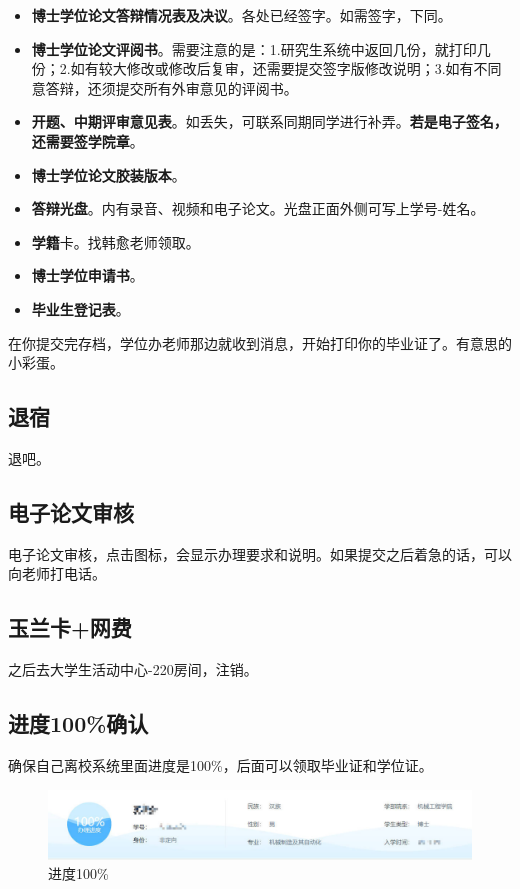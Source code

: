\documentclass[12pt,a4paper]{ctexart}
\begin{document}
\begin{itemize}[label=〇]
\item \textbf{博士学位论文答辩情况表及决议}。各处已经签字。如需签字，下同。
\item \textbf{博士学位论文评阅书}。需要注意的是：1.研究生系统中返回几份，就打印几份；2.如有较大修改或修改后复审，还需要提交签字版修改说明；3.如有不同意答辩，还须提交所有外审意见的评阅书。
\item \textbf{开题、中期评审意见表}。如丢失，可联系同期同学进行补弄。\textbf{若是电子签名，还需要签学院章}。
\item \textbf{博士学位论文胶装版本}。
\item \textbf{答辩光盘}。内有录音、视频和电子论文。光盘正面外侧可写上学号-姓名。
\item \textbf{学籍}卡。找韩愈老师领取。
\item \textbf{博士学位申请书}。
  \item \textbf{毕业生登记表}。
  \end{itemize}

  在你提交完存档，学位办老师那边就收到消息，开始打印你的毕业证了。有意思的小彩蛋。
  \subsection{退宿}
\label{sec:tuisu}

退吧。

\subsection{电子论文审核}
\label{sec:Epaper}

电子论文审核，点击图标，会显示办理要求和说明。如果提交之后着急的话，可以向老师打电话。

 \subsection{玉兰卡+网费}
\label{sec:yulan}

之后去大学生活动中心-220房间，注销。

\subsection{进度100\%确认}
\label{sec:jindu100}

确保自己离校系统里面进度是100\%，后面可以领取毕业证和学位证。
  \begin{figure}[H]
    \centering
    \includegraphics[width=1.0\textwidth]{images/jindu.jpg}  %
    \caption{进度100\%}
    \label{fig:jindu}
  \end{figure}
\end{document}
